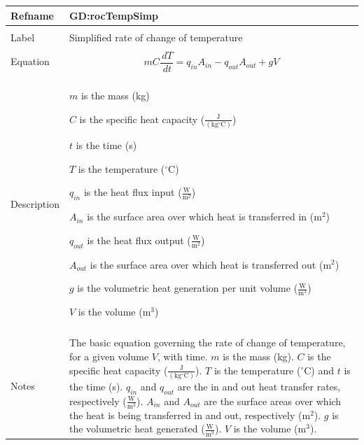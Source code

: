 \documentclass[12pt]{article}
\begin{document}
\noindent \begin{minipage}{\textwidth}
\begin{tabular}{p{} p{}}
\toprule \textbf{Refname} & \textbf{GD:rocTempSimp}
\label{GD:rocTempSimp}
\\ \midrule \\
Label & Simplified rate of change of temperature
\\ \midrule \\
Equation & \begin{displaymath}
           m C \frac{\,dT}{\,dt}={q_{in}} {A_{in}}-{q_{out}} {A_{out}}+g V
           \end{displaymath}
\\ \midrule \\
Description & \begin{symbDescription}
              \item{$m$ is the mass (kg)}
              \item{$C$ is the specific heat capacity ($\frac{\text{J}}{(\text{kg}{}^{\circ}\text{C})}$)}
              \item{$t$ is the time (s)}
              \item{$T$ is the temperature (${}^{\circ}$C)}
              \item{${q_{in}}$ is the heat flux input ($\frac{\text{W}}{\text{m}^{2}}$)}
              \item{${A_{in}}$ is the surface area over which heat is transferred in ($\text{m}^{2}$)}
              \item{${q_{out}}$ is the heat flux output ($\frac{\text{W}}{\text{m}^{2}}$)}
              \item{${A_{out}}$ is the surface area over which heat is transferred out ($\text{m}^{2}$)}
              \item{$g$ is the volumetric heat generation per unit volume ($\frac{\text{W}}{\text{m}^{3}}$)}
              \item{$V$ is the volume ($\text{m}^{3}$)}
              \end{symbDescription}
\\ \midrule \\
Notes & The basic equation governing the rate of change of temperature, for a given volume $V$, with time. $m$ is the mass (kg). $C$ is the specific heat capacity ($\frac{\text{J}}{(\text{kg}{}^{\circ}\text{C})}$). $T$ is the temperature (${}^{\circ}$C) and $t$ is the time (s). ${q_{in}}$ and ${q_{out}}$ are the in and out heat transfer rates, respectively ($\frac{\text{W}}{\text{m}^{2}}$). ${A_{in}}$ and ${A_{out}}$ are the surface areas over which the heat is being transferred in and out, respectively ($\text{m}^{2}$). $g$ is the volumetric heat generated ($\frac{\text{W}}{\text{m}^{3}}$). $V$ is the volume ($\text{m}^{3}$).

\end{tabular}
\end{minipage}
\end{document}
